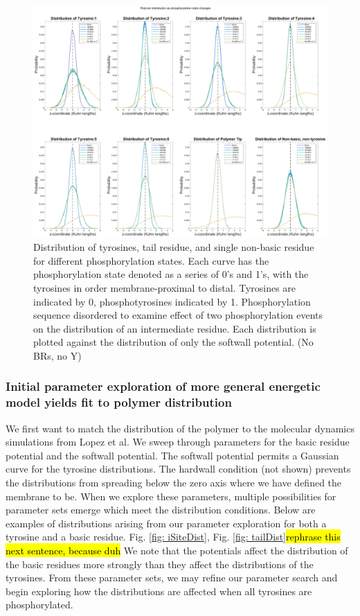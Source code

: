 \documentclass[../../AdvancementSummary.tex]{subfiles}
\begin{document}
\begin{figure}[H]
\begin{center}
\includegraphics[width=\linewidth]{ResultsFigures/CD3ZetaSoftwallPiecewiseBasicsY/Phosphorylation/iSiteDistribution135624.eps}
\end{center}
\caption{Distribution of tyrosines, tail residue, and single non-basic residue for different phosphorylation states. Each curve has the phosphorylation state denoted as a series of 0's and 1's, with the tyrosines in order membrane-proximal to distal. Tyrosines are indicated by 0, phosphotyrosines indicated by 1. Phosphorylation sequence disordered to examine effect of two phosphorylation events on the distribution of an intermediate residue. Each distribution is plotted against the distribution of only the softwall potential. (No BRs, no Y) \label{fig: Dist135624}}
\end{figure}

\subsubsection{Initial parameter exploration of more general energetic model yields fit to polymer distribution}

We first want to match the distribution of the polymer to the molecular dynamics simulations from Lopez et al. We sweep through parameters for the basic residue potential and the softwall potential. The softwall potential permits a Gaussian curve for the tyrosine distributions.  The hardwall condition (not shown) prevents the distributions from spreading below the zero axis where we have defined the membrane to be. When we explore these parameters, multiple possibilities for parameter sets emerge which meet the distribution conditions. Below are examples of distributions arising from our parameter exploration for both a tyrosine and a basic residue. Fig. \ref{fig: iSiteDist}, Fig. \ref{fig: tailDist}\hl{rephrase this next sentence, because duh} We note that the potentials affect the distribution of the basic residues more strongly than they affect the distributions of the tyrosines. From these parameter sets, we may refine our parameter search and begin exploring how the distributions are affected when all tyrosines are phosphorylated. 
\end{document}

